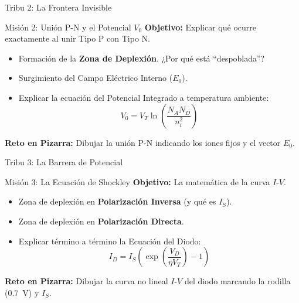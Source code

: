 \documentclass[10pt, aspectratio=169]{beamer}
\begin{document}
\begin{frame}{Tribu 2: La Frontera Invisible}
  \begin{block}{\faProjectDiagram \quad Misión 2: Unión P-N y el Potencial $V_0$}
    \textbf{Objetivo:} Explicar qué ocurre exactamente al unir Tipo P con Tipo N.
    \vspace{0.2cm}
    \begin{itemize}
        \item Formación de la \textbf{Zona de Deplexión}. ¿Por qué está ``despoblada''?
        \item Surgimiento del Campo Eléctrico Interno ($E_0$).
        \item Explicar la ecuación del Potencial Integrado a temperatura ambiente:
        \begin{equation*}
            V_0 = V_T \ln \left( \frac{N_A N_D}{n_i^2} \right)
        \end{equation*}
    \end{itemize}
  \end{block}
  \vspace{0.1cm}
  \textbf{\faChalkboard \quad Reto en Pizarra:} Dibujar la unión P-N indicando los iones fijos y el vector $E_0$.
\end{frame}

\begin{frame}{Tribu 3: La Barrera de Potencial}
  \begin{block}{\faChartLine \quad Misión 3: La Ecuación de Shockley}
    \textbf{Objetivo:} La matemática de la curva $I$-$V$.
    \vspace{0.2cm}
    \begin{itemize}
        \item Zona de deplexión en \textbf{Polarización Inversa} (y qué es $I_S$).
        \item Zona de deplexión en \textbf{Polarización Directa}.
        \item Explicar término a término la Ecuación del Diodo:
        \begin{equation*}
            I_D = I_S \left( \exp\left(\frac{V_D}{\eta V_T}\right) - 1 \right)
        \end{equation*}
    \end{itemize}
  \end{block}
  \vspace{0.1cm}
  \textbf{\faChalkboard \quad Reto en Pizarra:} Dibujar la curva no lineal $I$-$V$ del diodo marcando la rodilla (\qty{0.7}{\volt}) y $I_S$.
\end{frame}
\end{document}
